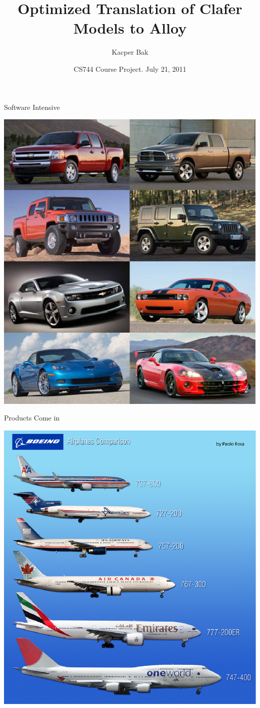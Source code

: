 \documentclass[table,15pt,t]{beamer}
\title{Optimized Translation of Clafer Models to Alloy}
\author{Kacper Bak}
\institute{\small Generative Software Development Lab\\University of Waterloo}
\date{CS744 Course Project. July 21, 2011}
\newcommand{\vmiddle}[1]{
  \vspace{\stretch{1}}
  #1
  \vspace{\stretch{1}}
}
\newcommand{\hmiddle}[1]{
  \begin{center}#1\end{center}
}
\newcounter{i}
\begin{document}
\begin{frame}[plain]
  \vmiddle{\titlepage}
\end{frame}

\begin{frame}{Software Intensive}
  \hmiddle{\includegraphics[scale=0.4]{figs/cars}}
\end{frame}

\begin{frame}{Products Come in}
  \hmiddle{\includegraphics[scale=0.5]{figs/planes}}
\end{frame}
\end{document}
